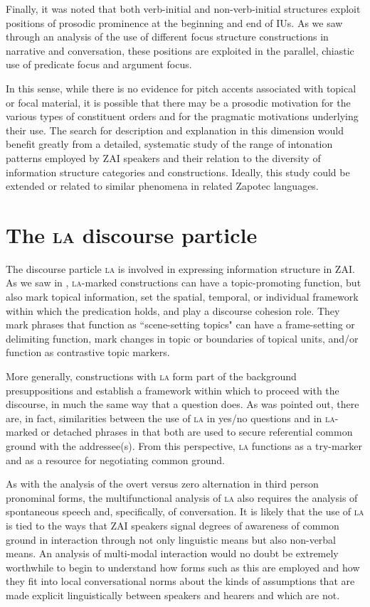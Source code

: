 Finally, it was noted that both verb-initial and non-verb-initial structures exploit positions of prosodic prominence at the beginning and end of IUs. As we saw through an analysis of the use of different focus structure constructions in narrative and conversation, these positions are exploited in the parallel, chiastic use of predicate focus and argument focus. 

In this sense, while there is no evidence for pitch accents associated with topical or focal material, it is possible that there may be a prosodic motivation for the various types of constituent orders and for the pragmatic motivations underlying their use. The search for description and explanation in this dimension would benefit greatly from a detailed, systematic study of the range of intonation patterns employed by ZAI speakers and their relation to the diversity of information structure categories and constructions. Ideally, this study could be extended or related to similar phenomena in related Zapotec languages.



\section{The \textsc{la} discourse particle}

The discourse particle \textsc{la} is involved in expressing information structure in ZAI. As we saw in , \textsc{la}-marked constructions can have a topic-promoting function, but also mark topical information, set the spatial, temporal, or individual framework within which the predication holds, and play a discourse cohesion role. They mark phrases that function as ``scene-setting topics" can have a frame-setting or delimiting function, mark changes in topic or boundaries of topical units, and/or function as contrastive topic markers.

More generally, constructions with \textsc{la} form part of the background presuppositions and establish a framework within which to proceed with the discourse, in much the same way that a question does. As was pointed out, there are, in fact, similarities between the use of \textsc{la} in yes/no questions and in \textsc{la}-marked or detached phrases in that both are used to secure referential common ground with the addressee(s). From this perspective, \textsc{la} functions as a try-marker and as a resource for negotiating common ground. 

As with the analysis of the overt versus zero alternation in third person pronominal forms, the multifunctional analysis of \textsc{la} also requires the analysis of spontaneous speech and, specifically, of conversation. It is likely that the use of \textsc{la} is tied to the ways that ZAI speakers signal degrees of awareness of common ground in interaction through not only linguistic means but also non-verbal means. An analysis of multi-modal interaction would no doubt be extremely worthwhile to begin to understand how forms such as this are employed and how they fit into local conversational norms about the kinds of assumptions that are made explicit linguistically between speakers and hearers and which are not. 

